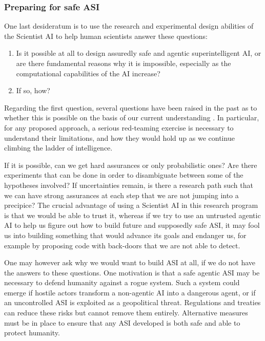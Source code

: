     \subsubsection{Preparing for safe ASI}\label{sec:plan:applications:asi}

One last desideratum is to use the research and experimental design abilities of the Scientist AI to help human scientists answer these questions:
\begin{enumerate}
    \item Is it possible at all to design assuredly safe and agentic superintelligent AI, or are there fundamental reasons why it is impossible, especially as the computational capabilities of the AI increase?
    \item If so, how?
\end{enumerate}
   
Regarding the first question, several questions have been raised in the past as to whether this is possible on the basis of our current understanding \cite{arxiv.org.abs.2302.00805,en.wikipedia.org.wiki.Superintelligence..Paths..Dangers..Strategies}. In particular, for any proposed approach, a serious red-teaming exercise is necessary to understand their limitations, and how they would hold up as we continue climbing the ladder of intelligence.

If it is possible, can we get hard assurances or only probabilistic ones? Are there experiments that can be done in order to disambiguate between some of the hypotheses involved? If uncertainties remain, is there a research path such that we can have strong assurances at each step that we are not jumping into a precipice? The crucial advantage of using a Scientist AI in this research program is that we would be able to trust it, whereas if we try to use an untrusted agentic AI to help us figure out how to build future and supposedly safe ASI, it may fool us into building something that would advance its goals and endanger us, for example by proposing code with back-doors that we are not able to detect.

One may however ask why we would want to build ASI at all, if we do not have the answers to these questions. One motivation is that a safe agentic ASI may be necessary to defend humanity against a rogue system. Such a system could emerge if hostile actors transform a non-agentic AI into a dangerous agent, or if an uncontrolled ASI is exploited as a geopolitical threat. Regulations and treaties can reduce these risks but cannot remove them entirely. Alternative measures must be in place to ensure that any ASI developed is both safe and able to protect humanity.    
